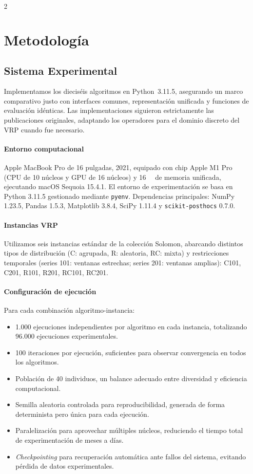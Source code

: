 \documentclass[10pt,a4paper]{extarticle}
\begin{document}
\begin{multicols}{2}
\section{Metodología}\label{sec:metodologia}
\subsection{Sistema Experimental}
Implementamos los dieciséis algoritmos en Python~3.11.5, asegurando un marco comparativo justo con interfaces comunes, representación unificada y funciones de evaluación idénticas. Las implementaciones siguieron estrictamente las publicaciones originales, adaptando los operadores para el dominio discreto del VRP cuando fue necesario.

\paragraph{Entorno computacional} Apple MacBook Pro de 16 pulgadas, 2021, equipado con chip Apple M1 Pro (CPU de 10 núcleos y GPU de 16 núcleos) y \SI{16}{\giga\byte} de memoria unificada, ejecutando macOS Sequoia 15.4.1. El entorno de experimentación se basa en Python 3.11.5 gestionado mediante \texttt{pyenv}. Dependencias principales: NumPy 1.23.5, Pandas 1.5.3, Matplotlib 3.8.4, SciPy 1.11.4 y \texttt{scikit-posthocs} 0.7.0.

\paragraph{Instancias VRP} Utilizamos seis instancias estándar de la colección Solomon, abarcando distintos tipos de distribución (C: agrupada, R: aleatoria, RC: mixta) y restricciones temporales (series 101: ventanas estrechas; series 201: ventanas amplias): C101, C201, R101, R201, RC101, RC201.

\paragraph{Configuración de ejecución} Para cada combinación algoritmo-instancia:
\begin{itemize}
\item 1.000 ejecuciones independientes por algoritmo en cada instancia, totalizando 96.000 ejecuciones experimentales.
\item 100 iteraciones por ejecución, suficientes para observar convergencia en todos los algoritmos.
\item Población de 40 individuos, un balance adecuado entre diversidad y eficiencia computacional.
\item Semilla aleatoria controlada para reproducibilidad, generada de forma determinista pero única para cada ejecución.
\item Paralelización para aprovechar múltiples núcleos, reduciendo el tiempo total de experimentación de meses a días.
\item \textit{Checkpointing} para recuperación automática ante fallos del sistema, evitando pérdida de datos experimentales.
\end{itemize}


\end{multicols}
\end{document}
